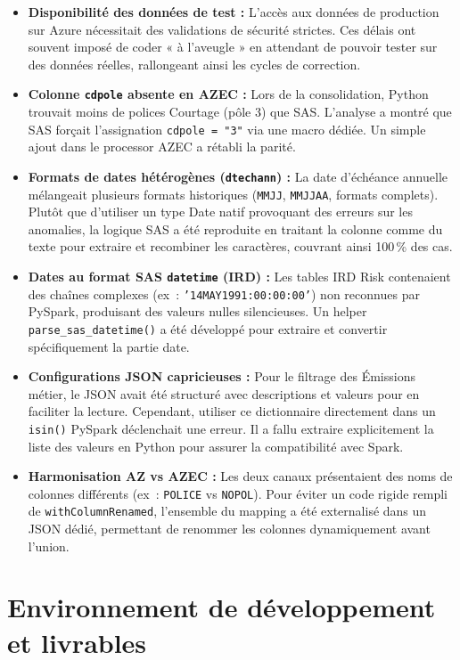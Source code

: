 \begin{itemize}[label={---}]
    \item \textbf{Disponibilité des données de test :} L'accès aux données de production sur Azure nécessitait des validations de sécurité strictes. Ces délais ont souvent imposé de coder « à l'aveugle » en attendant de pouvoir tester sur des données réelles, rallongeant ainsi les cycles de correction.
    \item \textbf{Colonne \texttt{cdpole} absente en AZEC :} Lors de la consolidation, Python trouvait moins de polices Courtage (pôle 3) que SAS. L'analyse a montré que SAS forçait l'assignation \texttt{cdpole = "3"} via une macro dédiée. Un simple ajout dans le processor AZEC a rétabli la parité.
    \item \textbf{Formats de dates hétérogènes (\texttt{dtechann}) :} La date d'échéance annuelle mélangeait plusieurs formats historiques (\texttt{MMJJ}, \texttt{MMJJAA}, formats complets). Plutôt que d'utiliser un type Date natif provoquant des erreurs sur les anomalies, la logique SAS a été reproduite en traitant la colonne comme du texte pour extraire et recombiner les caractères, couvrant ainsi 100\,\% des cas.
    \item \textbf{Dates au format SAS \texttt{datetime} (IRD) :} Les tables IRD Risk contenaient des chaînes complexes (ex~: \texttt{'14MAY1991:00:00:00'}) non reconnues par PySpark, produisant des valeurs nulles silencieuses. Un helper \texttt{parse\_sas\_datetime()} a été développé pour extraire et convertir spécifiquement la partie date.
    \item \textbf{Configurations JSON capricieuses :} Pour le filtrage des Émissions métier, le JSON avait été structuré avec descriptions et valeurs pour en faciliter la lecture. Cependant, utiliser ce dictionnaire directement dans un \texttt{isin()} PySpark déclenchait une erreur. Il a fallu extraire explicitement la liste des valeurs en Python pour assurer la compatibilité avec Spark.
    \item \textbf{Harmonisation AZ vs AZEC :} Les deux canaux présentaient des noms de colonnes différents (ex~: \texttt{POLICE} vs \texttt{NOPOL}). Pour éviter un code rigide rempli de \texttt{withColumnRenamed}, l'ensemble du mapping a été externalisé dans un JSON dédié, permettant de renommer les colonnes dynamiquement avant l'union.
\end{itemize}

\section{Environnement de développement et livrables}

